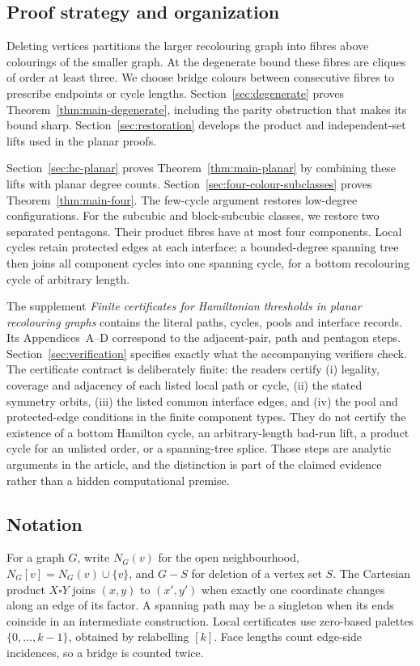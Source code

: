 \documentclass[11pt]{article}
\theoremstyle{remark}
\numberwithin{equation}{section}
\numberwithin{table}{section}
\begin{document}
\subsection{Proof strategy and organization}
Deleting vertices partitions the larger recolouring graph into fibres
above colourings of the smaller graph. At the degenerate bound these
fibres are cliques of order at least three. We choose bridge colours
between consecutive fibres to prescribe endpoints or cycle lengths.
Section~\ref{sec:degenerate} proves Theorem~\ref{thm:main-degenerate},
including the parity obstruction that makes its bound sharp.
Section~\ref{sec:restoration} develops the product and independent-set
lifts used in the planar proofs.

Section~\ref{sec:hc-planar} proves Theorem~\ref{thm:main-planar} by
combining these lifts with planar degree counts. Section~\ref{sec:four-colour-subclasses}
proves Theorem~\ref{thm:main-four}. The few-cycle argument restores
low-degree configurations. For the subcubic and block-subcubic classes,
we restore two separated pentagons. Their product fibres have at most
four components. Local cycles retain protected edges at each interface;
a bounded-degree spanning tree then joins all component cycles into
one spanning cycle, for a bottom recolouring cycle of arbitrary length.

The supplement \emph{Finite certificates for Hamiltonian thresholds in
planar recolouring graphs} contains the literal paths, cycles, pools
and interface records. Its Appendices~A--D correspond to the adjacent-pair,
path and pentagon steps. Section~\ref{sec:verification} specifies exactly
what the accompanying verifiers check. The certificate contract is deliberately
finite: the readers certify (i) legality, coverage and adjacency of each
listed local path or cycle, (ii) the stated symmetry orbits, (iii) the listed
common interface edges, and (iv) the pool and protected-edge conditions in
the finite component types. They do not certify the existence of a bottom
Hamilton cycle, an arbitrary-length bad-run lift, a product cycle for an
unlisted order, or a spanning-tree splice. Those steps are analytic
arguments in the article, and the distinction is part of the claimed
evidence rather than a hidden computational premise.

\subsection{Notation}
For a graph $G$, write $N_G(v)$ for the open neighbourhood,
$N_G[v]=N_G(v)\cup\{v\}$, and $G-S$ for deletion of a vertex set $S$.
The Cartesian product $X\square Y$ joins $(x,y)$ to $(x',y')$ when
exactly one coordinate changes along an edge of its factor.
A spanning path may be a singleton when its ends coincide in an
intermediate construction. Local certificates use zero-based palettes
$\{0,\ldots,k-1\}$, obtained by relabelling $[k]$.
Face lengths count edge-side incidences, so a bridge is counted twice.
\end{document}
